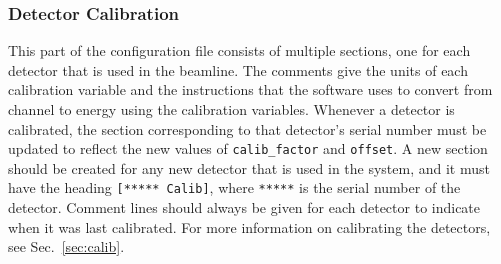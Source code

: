 \subsubsection{Detector Calibration}

This part of the configuration file consists of multiple sections, one for each
detector that is used in the beamline. The comments give the units of each
calibration variable and the instructions that the software uses to convert from
channel to energy using the calibration variables. Whenever a detector is
calibrated, the section corresponding to that detector's serial number must be
updated to reflect the new values of \verb|calib_factor| and \texttt{offset}. A
new section should be created for any new detector that is used in the system,
and it must have the heading \verb|[***** Calib]|, where \verb|*****| is the
serial number of the detector. Comment lines should always be given for each
detector to indicate when it was last calibrated. For more information on
calibrating the detectors, see Sec.~\ref{sec:calib}.

